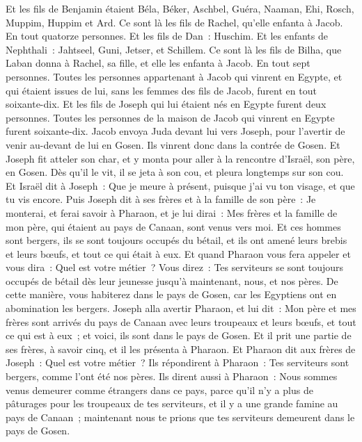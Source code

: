 \begin{multicols}{2}
Et les fils de Benjamin étaient Béla, Béker, Aschbel, Guéra, Naaman, Ehi, Rosch, Muppim, Huppim et Ard.
Ce sont là les fils de Rachel, qu'elle enfanta à Jacob. En tout quatorze personnes.
Et les fils de Dan~: Huschim.
Et les enfants de Nephthali~: Jahtseel, Guni, Jetser, et Schillem.
Ce sont là les fils de Bilha, que Laban donna à Rachel, sa fille, et elle les enfanta à Jacob. En tout sept personnes.
Toutes les personnes appartenant à Jacob qui vinrent en Egypte, et qui étaient issues de lui, sans les femmes des fils de Jacob, furent en tout soixante-dix.
Et les fils de Joseph qui lui étaient nés en Egypte furent deux personnes. Toutes les personnes de la maison de Jacob qui vinrent en Egypte furent soixante-dix.
Jacob envoya Juda devant lui vers Joseph, pour l'avertir de venir au-devant de lui en Gosen. Ils vinrent donc dans la contrée de Gosen.
Et Joseph fit atteler son char, et y monta pour aller à la rencontre d'Israël, son père, en Gosen. Dès qu'il le vit, il se jeta à son cou, et pleura longtemps sur son cou.
Et Israël dit à Joseph~: Que je meure à présent, puisque j'ai vu ton visage, et que tu vis encore.
Puis Joseph dit à ses frères et à la famille de son père~: Je monterai, et ferai savoir à Pharaon, et je lui dirai~: Mes frères et la famille de mon père, qui étaient au pays de Canaan, sont venus vers moi.
Et ces hommes sont bergers, ils se sont toujours occupés du bétail, et ils ont amené leurs brebis et leurs bœufs, et tout ce qui était à eux.
Et quand Pharaon vous fera appeler et vous dira~: Quel est votre métier~?
Vous direz~: Tes serviteurs se sont toujours occupés de bétail dès leur jeunesse jusqu'à maintenant, nous, et nos pères. De cette manière, vous habiterez dans le pays de Gosen, car les Egyptiens ont en abomination les bergers.
\VerseOne{}Joseph alla avertir Pharaon, et lui dit~: Mon père et mes frères sont arrivés du pays de Canaan avec leurs troupeaux et leurs bœufs, et tout ce qui est à eux~; et voici, ils sont dans le pays de Gosen.
Et il prit une partie de ses frères, à savoir cinq, et il les présenta à Pharaon.
Et Pharaon dit aux frères de Joseph~: Quel est votre métier~? Ils répondirent à Pharaon~: Tes serviteurs sont bergers, comme l'ont été nos pères.
Ils dirent aussi à Pharaon~: Nous sommes venus demeurer comme étrangers dans ce pays, parce qu'il n'y a plus de pâturages pour les troupeaux de tes serviteurs, et il y a une grande famine au pays de Canaan~; maintenant nous te prions que tes serviteurs demeurent dans le pays de Gosen.

\end{multicols}

